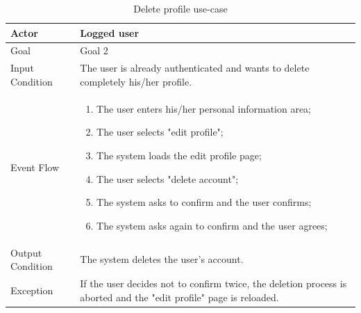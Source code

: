 \begin{table}[H]
\begin{center}
\begin{tabular}{p{} | p{}}
\hline
Actor & Logged user\\
\hline
Goal & Goal 2\\
\hline
Input Condition & The user is already authenticated and wants to delete completely his/her profile.\\
\hline
Event Flow & 
\begin{enumerate}
\item The user enters his/her personal information area;
\item The user selects "edit profile";
\item The system loads the edit profile page;
\item The user selects "delete account";
\item The system asks to confirm and the user confirms;
\item The system asks again to confirm and the user agrees;
\end{enumerate} \\
\hline
Output Condition & The system deletes the user's account.\\
\hline
Exception & If the user decides not to confirm twice, the deletion process is aborted and the "edit profile" page is reloaded.\\
\hline
\end{tabular}
\end{center}
\caption{Delete profile use-case}
\label{delete_profile_uc}
\end{table}